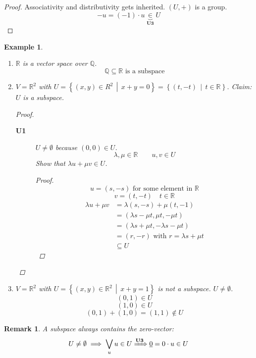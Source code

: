\documentclass[a4paper,landscape,twocolumn]{article}
\newcommand\setdef[2]{\left\{#1\,\middle|\,#2\right\}}
\newtheorem{ex}{Example}[section]
\newtheorem{rem}{Remark}[section]
\begin{document}
\begin{proof}
  Associativity and distributivity gets inherited.
  $(U, +)$ is a group.
  \[ -u = (-1) \cdot u \underbrace{\in}_{\textbf{U3}} U \]
\end{proof}

\begin{ex}
  \begin{enumerate}
    \item $\mathbb R$ is a vector space over $\mathbb Q$.
      \[ \mathbb Q \subseteq \mathbb R \text{ is a subspace} \]
    \item $V = \mathbb R^2$ with $U = \setdef{(x, y) \in R^2}{x + y = 0} = \setdef{(t, -t)}{t \in \mathbb R}$.
      Claim: $U$ is a subspace.

      \begin{proof}
        \begin{description}
          \item[\textbf{U1}]
            $U \neq \emptyset$ because $(0, 0) \in U$.
            \[ \lambda, \mu \in \mathbb R \qquad u,v \in U \]
            Show that $\lambda u + \mu v \in U$.
            \begin{proof}
              \[ u = (s, -s) \text{ for some element in } \mathbb R \]
              \[ v = (t, -t) \quad t \in \mathbb R \]
              \begin{align*}
                \lambda u + \mu v &= \lambda (s, -s) + \mu (t, -1) \\
                  &= (\lambda s - \mu t, \mu t, -\mu t) \\
                  &= (\lambda s + \mu t, -\lambda s - \mu t) \\
                  &= (r, -r) \text{ with } r = \lambda s + \mu t \\
                  &\subseteq U
              \end{align*}
            \end{proof}
        \end{description}
      \end{proof}

    \item $V = \mathbb R^2$ with $U = \setdef{(x, y) \in \mathbb R^2}{x + y = 1}$
      is not a subspace. $U \neq \emptyset$.
      \[ (0, 1) \in U \]
      \[ (1, 0) \in U \]
      \[ (0, 1) + (1, 0) = (1, 1) \not\in U \]
  \end{enumerate}
\end{ex}

\begin{rem}
  A subspace always contains the zero-vector:
  \[ U \neq \emptyset \implies \bigvee_{u} u \in U \xRightarrow{\textbf{U3}} \underline{0} = 0 \cdot u \in U \]
\end{rem}
\end{document}
